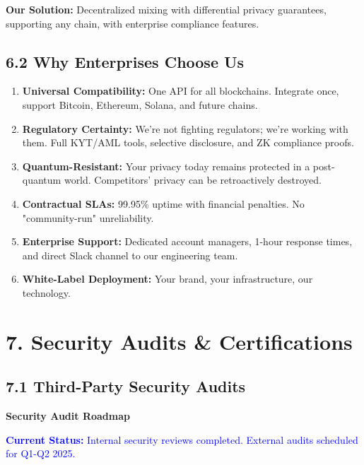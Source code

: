 \documentclass[11pt,a4paper]{article}
\begin{document}
\textbf{Our Solution:} Decentralized mixing with differential privacy guarantees, supporting any chain, with enterprise compliance features.

\subsection{6.2 Why Enterprises Choose Us}

\begin{enumerate}
    \item \textbf{Universal Compatibility:} One API for all blockchains. Integrate once, support Bitcoin, Ethereum, Solana, and future chains.

    \item \textbf{Regulatory Certainty:} We're not fighting regulators; we're working with them. Full KYT/AML tools, selective disclosure, and ZK compliance proofs.

    \item \textbf{Quantum-Resistant:} Your privacy today remains protected in a post-quantum world. Competitors' privacy can be retroactively destroyed.

    \item \textbf{Contractual SLAs:} 99.95\% uptime with financial penalties. No "community-run" unreliability.

    \item \textbf{Enterprise Support:} Dedicated account managers, 1-hour response times, and direct Slack channel to our engineering team.

    \item \textbf{White-Label Deployment:} Your brand, your infrastructure, our technology.
\end{enumerate}

\section{7. Security Audits \& Certifications}

\subsection{7.1 Third-Party Security Audits}

\textbf{Security Audit Roadmap}

\textcolor{blue}{\textbf{Current Status:} Internal security reviews completed. External audits scheduled for Q1-Q2 2025.}
\end{document}
